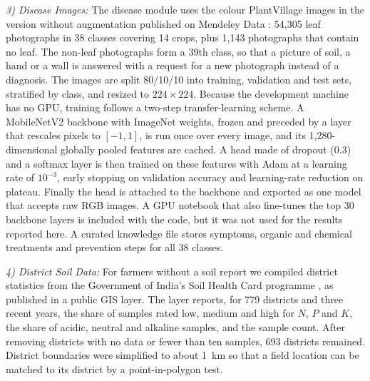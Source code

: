 \documentclass[conference]{IEEEtran}
\begin{document}
\textit{3) Disease Images:} The disease module uses the colour PlantVillage images \cite{hughes2015} in the version without augmentation published on Mendeley Data \cite{pandian2019}: 54,305 leaf photographs in 38 classes covering 14 crops, plus 1,143 photographs that contain no leaf. The non-leaf photographs form a 39th class, so that a picture of soil, a hand or a wall is answered with a request for a new photograph instead of a diagnosis. The images are split 80/10/10 into training, validation and test sets, stratified by class, and resized to $224 \times 224$. Because the development machine has no GPU, training follows a two-step transfer-learning scheme. A MobileNetV2 backbone \cite{sandler2018} with ImageNet weights, frozen and preceded by a layer that rescales pixels to $[-1, 1]$, is run once over every image, and its 1,280-dimensional globally pooled features are cached. A head made of dropout (0.3) and a softmax layer is then trained on these features with Adam at a learning rate of $10^{-3}$, early stopping on validation accuracy and learning-rate reduction on plateau. Finally the head is attached to the backbone and exported as one model that accepts raw RGB images. A GPU notebook that also fine-tunes the top 30 backbone layers is included with the code, but it was not used for the results reported here. A curated knowledge file stores symptoms, organic and chemical treatments and prevention steps for all 38 classes.

\textit{4) District Soil Data:} For farmers without a soil report we compiled district statistics from the Government of India's Soil Health Card programme \cite{shc}, as published in a public GIS layer. The layer reports, for 779 districts and three recent years, the share of samples rated low, medium and high for $N$, $P$ and $K$, the share of acidic, neutral and alkaline samples, and the sample count. After removing districts with no data or fewer than ten samples, 693 districts remained. District boundaries were simplified to about 1~km so that a field location can be matched to its district by a point-in-polygon test.
\end{document}
